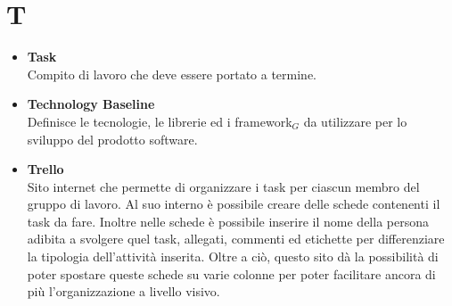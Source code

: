 \chapter{T} \label{T}
	\begin{itemize}
		\item \textbf{Task}\\
		Compito di lavoro che deve essere portato a termine.
		
		\item \textbf{Technology Baseline}\\
		Definisce le tecnologie, le librerie ed i framework$_G$ da utilizzare per lo sviluppo del prodotto software.
		
		\item \textbf{Trello}\\
		Sito internet che permette di organizzare i task per ciascun membro del gruppo di lavoro.
		Al suo interno è possibile creare delle schede contenenti il task da fare.
		Inoltre nelle schede è possibile inserire il nome della persona adibita a svolgere quel task, allegati, commenti ed etichette per differenziare la tipologia dell'attività inserita.
		Oltre a ciò, questo sito dà la possibilità di poter spostare queste schede su varie colonne per poter facilitare ancora di più l'organizzazione a livello visivo.
	\end{itemize}